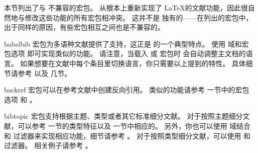 本节列出了与 \biblatex 不兼容的宏包。
\biblatex 从根本上重新实现了 \LaTeX 的文献功能，因此很自然地与修改这些功能的所有宏包相冲突。
这并不是 \biblatex 独有的——在列出的宏包中，出于同样的原因，有些宏包相互之间也是不兼容的。

\begin{marglist}

\item[babelbib]
 宏包为多语种文献提供了支持，这正是 \biblatex 的一个典型特点。
使用  域和宏包选项  即可实现类似的功能。
请注意，当载入  或  宏包时 \biblatex 会自动调整主文档的语言。
如果想要在文献中每个条目里切换语言，你只需要以上提到的特性。
具体细节请参考  以及  几节。

\item[backref]
 宏包可以在参考文献中创建反向引用。
类似的功能请参考  一节中的宏包选项  和 。

\item[bibtopic]
 宏包支持根据主题、类型或者其它标准细分文献。
对于按照主题细分文献，可以参考  一节的类型特征以及  一节中相应的。
另外，你也可以使用  域结合  和  过滤器来实现相应功能，细节请参考 。
对于按照类型细分文献，可以使用  和  过滤器。
相关例子请参考 。


\end{marglist}

